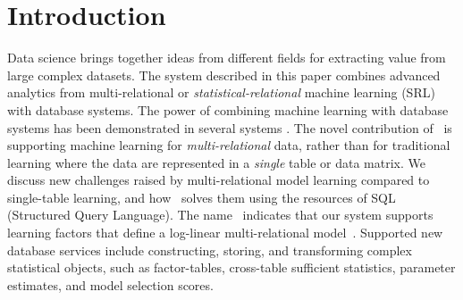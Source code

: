 \documentclass{IEEEtran}
\begin{document}
\section{Introduction} Data science brings together ideas from different fields for extracting value from large complex datasets. The system described in this paper combines advanced analytics from multi-relational or {\em statistical-relational} machine learning (SRL) with database systems. The power of combining machine learning with database systems has been demonstrated in several systems 
%
\cite{MADlib_VLDB_2012,MLbase_ICDR_2013,Deshpande2006}.
The novel contribution of \FB\ is supporting machine learning for {\em multi-relational} data, rather than for traditional learning where the  data are represented in a {\em single} table or data matrix. 
%
We discuss new challenges raised by multi-relational model learning compared to single-table learning, and how \FB\ solves them using the resources of SQL (Structured Query Language). The name \FB\ indicates that our system supports learning factors that define a log-linear multi-relational model~\cite{Kimmig2015}. Supported new database services include constructing, storing, and transforming complex statistical objects, such as factor-tables, cross-table sufficient statistics, parameter estimates, and model selection scores.
\end{document}
